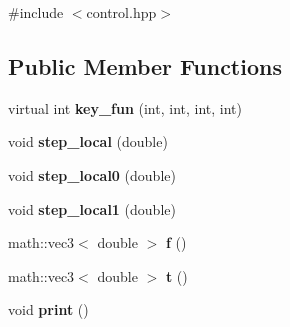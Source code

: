 {\ttfamily \#include $<$control.hpp$>$}\subsection*{Public Member Functions}
\begin{DoxyCompactItemize}
\item 
\hypertarget{classneb_1_1control_1_1rigid__body_1_1control_a66fc3682afd8f4a94ccd241cb3ddddb3}{
virtual int {\bfseries key\_\-fun} (int, int, int, int)}
\label{classneb_1_1control_1_1rigid__body_1_1control_a66fc3682afd8f4a94ccd241cb3ddddb3}

\item 
\hypertarget{classneb_1_1control_1_1rigid__body_1_1control_a0649203ba08991125250be485dad9308}{
void {\bfseries step\_\-local} (double)}
\label{classneb_1_1control_1_1rigid__body_1_1control_a0649203ba08991125250be485dad9308}

\item 
\hypertarget{classneb_1_1control_1_1rigid__body_1_1control_a347b217d2133bf301aa9f31e084ccd6a}{
void {\bfseries step\_\-local0} (double)}
\label{classneb_1_1control_1_1rigid__body_1_1control_a347b217d2133bf301aa9f31e084ccd6a}

\item 
\hypertarget{classneb_1_1control_1_1rigid__body_1_1control_a6fad3693d3a31440201a928bc04e71d4}{
void {\bfseries step\_\-local1} (double)}
\label{classneb_1_1control_1_1rigid__body_1_1control_a6fad3693d3a31440201a928bc04e71d4}

\item 
\hypertarget{classneb_1_1control_1_1rigid__body_1_1control_aeaae8332076304e32a811e6f06410e18}{
math::vec3$<$ double $>$ {\bfseries f} ()}
\label{classneb_1_1control_1_1rigid__body_1_1control_aeaae8332076304e32a811e6f06410e18}

\item 
\hypertarget{classneb_1_1control_1_1rigid__body_1_1control_a0f2f5f0c00acbf26b2ae23c1db70f1d9}{
math::vec3$<$ double $>$ {\bfseries t} ()}
\label{classneb_1_1control_1_1rigid__body_1_1control_a0f2f5f0c00acbf26b2ae23c1db70f1d9}

\item 
\hypertarget{classneb_1_1control_1_1rigid__body_1_1control_a13cbe1e4aa9e9cbd38cc2424526779a3}{
void {\bfseries print} ()}
\label{classneb_1_1control_1_1rigid__body_1_1control_a13cbe1e4aa9e9cbd38cc2424526779a3}

\end{DoxyCompactItemize}
